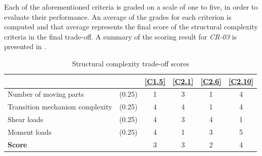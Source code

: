 Each of the aforementioned criteria is graded on a scale of one to five, in order to evaluate their performance.
An average of the grades for each criterion is computed and that average represents the final score of the structural complexity criteria in the final trade-off.
A summary of the scoring result for \textit{CR-03} is presented in .
\begin{table}[ht]
\centering
\caption{Structural complexity trade-off scores}
\label{tab:transtoff}
\begin{tabular}{lr|cccc}
\toprule
                    &     & \textbf{\ref{C1.5}} & \textbf{\ref{C2.1}} & \textbf{\ref{C2.6}} & \textbf{\ref{C2.10}} \\ \bottomrule

Number of moving parts &(0.25) & \cellcolor[HTML]{FD6864}1    & \cellcolor[HTML]{E0E383}3   & \cellcolor[HTML]{FD6864}1   & \cellcolor[HTML]{A2D07F}4   \\
Transition mechanism complexity &(0.25) & \cellcolor[HTML]{A2D07F}4  & \cellcolor[HTML]{A2D07F}4             & \cellcolor[HTML]{FD6864}1     & \cellcolor[HTML]{A2D07F}4                  \\
Shear loads &(0.25) & \cellcolor[HTML]{A2D07F}4    & \cellcolor[HTML]{E0E383}3   & \cellcolor[HTML]{A2D07F}4   & \cellcolor[HTML]{FD6864}1   \\
Moment loads &(0.25) & \cellcolor[HTML]{A2D07F}4    & \cellcolor[HTML]{FD6864}1   & \cellcolor[HTML]{E0E383}3   & \cellcolor[HTML]{63BE7B}5   \\
\hline

\textbf{Score}         &     & \cellcolor[HTML]{E0E383}3 & \cellcolor[HTML]{E0E383}3 & \cellcolor[HTML]{FCBF7B}2 & \cellcolor[HTML]{A2D07F}4 \\ \toprule
\end{tabular}
\end{table}


